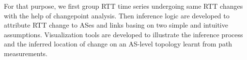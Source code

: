 For that purpose, we first group RTT time series undergoing same RTT changes with the help of changepoint analysis.
Then inference logic are developed to attribute RTT change to ASes and links basing on two simple and intuitive assumptions.
Visualization tools are developed to illustrate the inference process and the inferred location of change on an AS-level topology learnt from path measurements.
